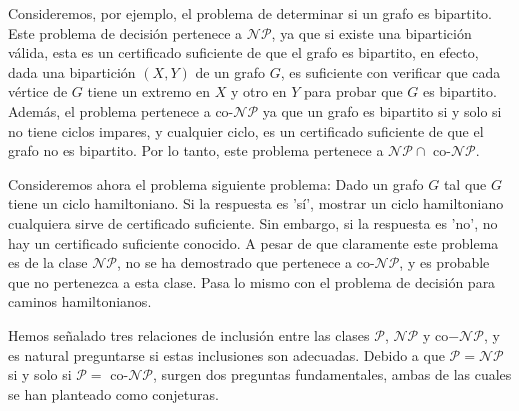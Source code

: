 \documentclass{article}
\begin{document}
Consideremos, por ejemplo, el problema de determinar
si un grafo es bipartito. Este problema de decisión pertenece
a $\mathcal{NP}$, ya que si existe una bipartición válida, esta es un
certificado suficiente de que el grafo es bipartito, en efecto,
dada una bipartición $(X,Y)$ de un grafo $G$, es
suficiente con verificar que cada vértice de $G$
tiene un extremo en $X$ y otro en $Y$ para probar que $G$ es bipartito.
Además, el problema pertenece a co-$\mathcal{NP}$ ya que un grafo es 
bipartito si y solo si no tiene ciclos impares, y cualquier ciclo, es un 
certificado suficiente de que el grafo no es bipartito. Por lo tanto, 
este problema pertenece a $\mathcal{NP} \cap$ co-$\mathcal{NP}$.

Consideremos ahora el problema siguiente problema: Dado un grafo $G$ tal 
que $G$ tiene un ciclo hamiltoniano.
Si la respuesta es 'sí', mostrar un ciclo hamiltoniano cualquiera sirve
de certificado suficiente. Sin embargo, si la respuesta es 'no', no
hay un certificado suficiente conocido. A pesar de que claramente
este problema es de la clase $\mathcal{NP}$, no se ha demostrado
que pertenece a co-$\mathcal{NP}$, y es probable que no
pertenezca a esta clase. Pasa lo mismo con el problema de
decisión para caminos hamiltonianos.

Hemos señalado tres relaciones de inclusión entre las clases
$\mathcal{P}$, $\mathcal{N}\mathcal{P}$ y
co$-\mathcal{N}\mathcal{P}$, y es natural preguntarse
si estas inclusiones son adecuadas. Debido a que
$\mathcal{P} = \mathcal{N}\mathcal{P}$
si y solo si $\mathcal{P} = $ co-$\mathcal{N}\mathcal{P}$,
surgen dos preguntas fundamentales, ambas de las cuales se han 
planteado como conjeturas. 

\setlength{\fboxsep}{10pt}
\noindent{}
\end{document}
